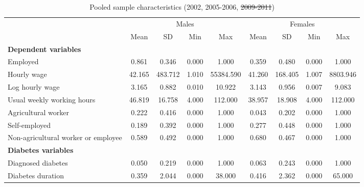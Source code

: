 \documentclass[12pt,english,british]{article}
\newcommand{\sym}[1]{\rlap{#1}}%
\providecommand{\DIFaddtex}[1]{{\protect\color{blue}\uwave{#1}}} %
\providecommand{\DIFdeltex}[1]{{\protect\color{red}\sout{#1}}}                      %
\providecommand{\DIFaddFL}[1]{\DIFadd{#1}} %
\providecommand{\DIFdelFL}[1]{\DIFdel{#1}} %
\providecommand{\DIFaddbeginFL}{} %
\providecommand{\DIFaddendFL}{} %
\providecommand{\DIFdelbeginFL}{} %
\providecommand{\DIFdelendFL}{} %
\providecommand{\DIFadd}[1]{\texorpdfstring{\DIFaddtex{#1}}{#1}} %
\providecommand{\DIFdel}[1]{\texorpdfstring{\DIFdeltex{#1}}{}} %
\begin{document}
\begin{table}[h]
\caption{\label{tab:Pooled-sample-characteristics}Pooled sample characteristics (2002, 2005-2006, \DIFdelbeginFL \DIFdelFL{2009-2011}\DIFdelendFL \DIFaddbeginFL \DIFaddFL{2009-2012}\DIFaddendFL )}
\begin{center}
\begin{adjustbox}{max width=\textwidth}

{ \def\sym#1{\ifmmode^{#1}\else\(^{#1}\)\fi} \begin{tabular}{l*{2}{cccc}}
\toprule
                    &\multicolumn{4}{c}{Males}                          &\multicolumn{4}{c}{Females}                        \\
                    &        Mean&          SD&         Min&         Max&        Mean&          SD&         Min&         Max\\
\midrule
\textbf{Dependent variables} &&&&&&&& \\
Employed            &       0.861&       0.346&       0.000&       1.000&       0.359&       0.480&       0.000&       1.000\\
Hourly wage             &      42.165&     483.712&       1.010&   55384.590&      41.260&     168.405&       1.007&    8803.946\\
Log hourly wage     &       3.165&       0.882&       0.010&      10.922&       3.143&       0.956&       0.007&       9.083\\
Usual weekly working hours&      46.819&      16.758&       4.000&     112.000&      38.957&      18.908&       4.000&     112.000\\
Agricultural worker &       0.222&       0.416&       0.000&       1.000&       0.043&       0.202&       0.000&       1.000\\
Self-employed       &       0.189&       0.392&       0.000&       1.000&       0.277&       0.448&       0.000&       1.000\\
Non-agricultural worker or employee&       0.589&       0.492&       0.000&       1.000&       0.680&       0.467&       0.000&       1.000\\
\textbf{Diabetes variables} &&&&&&&& \\
Diagnosed diabetes  &       0.050&       0.219&       0.000&       1.000&       0.063&       0.243&       0.000&       1.000\\
Diabetes duration   &       0.359&       2.044&       0.000&      38.000&       0.416&       2.362&       0.000&      65.000\\

\end{tabular}}
\end{adjustbox}
\end{center}
\end{table}
\end{document}
